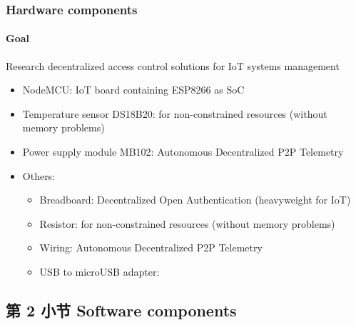 \documentclass[
    aspectratio=169,                   %
]{beamer}
\begin{document}
    \begin{frame}
        \frametitle{Hardware components}

        \paragraph{Goal} Research decentralized access control solutions for IoT systems management

        \begin{itemize}
            \item \alert{NodeMCU}: IoT board containing ESP8266 as SoC
            \item \alert{Temperature sensor DS18B20}: for non-constrained resources (without memory problems)
            \item \alert{Power supply module MB102}: Autonomous Decentralized P2P Telemetry
            \item \alert{Others:}
            \begin{itemize}
                \item \alert{Breadboard}: Decentralized Open Authentication (heavyweight for IoT)
                \item \alert{Resistor}: for non-constrained resources (without memory problems)
                \item \alert{Wiring}: Autonomous Decentralized P2P Telemetry   
                \item \alert{USB to microUSB adapter}:      
            \end{itemize}
        \end{itemize}

    \end{frame}

\subsection{第 2 小节 Software components}
\end{document}
